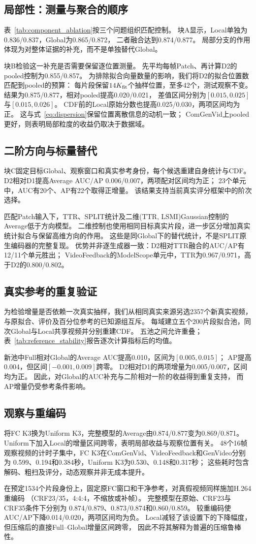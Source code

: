 \subsection{局部性：测量与聚合的顺序}
表~\ref{tab:component_ablation}按三个问题组织匹配控制。
块A显示，Local单独为0.836/0.837，Global为0.865/0.872，
二者融合达到0.874/0.877。
局部分支的作用体现为对整体证据的补充，而不是单独替代Global。

块B检验这一补充是否需要保留逐位置测量。
先平均每帧Patch、再计算D2的pooled控制为0.855/0.857。
为排除拟合向量数量的影响，我们将D2的拟合位置数匹配到pooled的预算：
每片段保留$14K_{\rm fit}$个抽样位置，至多42个，测试观察不变。
结果为0.875/0.877，相对pooled提高0.020/0.021，
差值区间分别为$[0.015,0.025]$与$[0.015,0.026]$。
CDF前的Local原始分数也提高0.025/0.030，两项区间均为正。
这与式~\eqref{eq:dispersion}保留位置离散信息的动机一致；
ComGenVid上pooled更好，则表明局部粒度的收益仍取决于数据域。

\subsection{二阶方向与标量替代}
块C固定目标Global、观察窗口和真实参考身份，每个候选重建自身统计与CDF。
D2相对D1提高Average AUC/AP 0.006/0.007，两项配对区间均为正；
23个单元中，AUC有20个、AP有22个取得正增量。
该结果支持当前真实评分框架中的阶次选择。

匹配Patch输入下，TTR、SPLIT统计及二维(TTR, LSMI)Gaussian控制的Average低于方向模型。
二维控制也使用相同目标真实片段，进一步区分增加真实统计拟合与保留高维方向的作用。
这些是同Global下的替代统计，不是SPLIT原生编码器的完整复现。
优势并非逐生成器一致：D2相对TTR融合的AUC/AP有12/11个单元胜出；
VideoFeedback的ModelScope单元中，TTR为0.967/0.971，高于D2的0.800/0.802。

\subsection{真实参考的重复验证}
为检验增量是否依赖一次真实抽样，我们从相同真实来源另选2357个新真实视频，
与原拟合、评价及百分位参考的已知源组互斥。
每域建立五个200片段拟合池，同次Global与Local共享视频并分别重建CDF。
五池之间允许重叠；表~\ref{tab:reference_stability}报告逐次计算指标后的均值。

新池中Full相对Global的Average AUC提高0.010，区间为$[0.005,0.015]$；
AP提高0.004，但区间$[-0.001,0.009]$跨零。
D2相对D1的两项增量为0.005/0.007，区间均为正。
因此，对Global的AUC补充与二阶相对一阶的收益得到重复支持，
而AP增量仍受参考条件影响。

\subsection{观察与重编码}
将FC K3换为Uniform K3，完整模型的Average由0.874/0.877变为0.869/0.871。
Uniform下加入Local的增量区间跨零，表明局部收益与观察位置有关。
48个16帧观察视频的计时子集中，FC K3在ComGenVid、VideoFeedback和GenVideo分别为
0.599、0.194和0.384秒，Uniform K3为0.530、0.148和0.317秒；
这些耗时包含解码、粗扫及评分，动态观察并非无成本提升。

在预定1534个片段身份上，固定原FC窗口和干净参考，对真假视频同样施加H.264重编码
（CRF23/35，4:4:4，不缩放或补帧）。
完整模型在原始、CRF23与CRF35条件下分别为
0.874/0.879、0.873/0.874和0.860/0.859。
较重编码使AUC/AP下降0.014/0.020，两项区间均为负。
Local减轻了该设置下的下降幅度，但压缩后的直接Full--Global增量区间跨零，
因此不将其解释为普遍的压缩鲁棒性。

